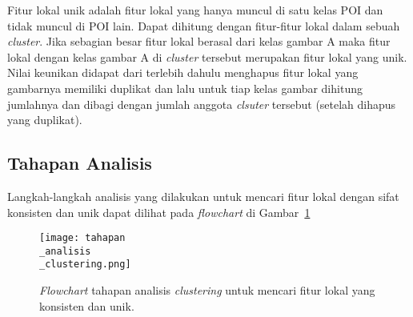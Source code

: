 Fitur lokal unik adalah fitur lokal yang hanya muncul di satu kelas POI dan tidak muncul di POI lain. Dapat dihitung dengan fitur-fitur lokal dalam sebuah \textit{cluster}. Jika sebagian besar fitur lokal berasal dari kelas gambar A maka fitur lokal dengan kelas gambar A di \textit{cluster} tersebut merupakan fitur lokal yang unik.  Nilai keunikan didapat dari terlebih dahulu menghapus fitur lokal yang gambarnya memiliki duplikat dan lalu untuk tiap kelas gambar dihitung jumlahnya dan dibagi dengan jumlah anggota \textit{clsuter} tersebut (setelah dihapus yang duplikat).

\subsection{Tahapan Analisis}
\label{subsec:tahapan_analisis_clustering}
Langkah-langkah analisis yang dilakukan untuk mencari fitur lokal dengan sifat konsisten dan unik dapat dilihat pada \textit{flowchart} di Gambar~\ref{fig:tahapan_analisis_clustering}
\begin{figure}[H]
	\centering
	\texttt{[image: tahapan\\\_analisis\\\_clustering.png]}
	\caption{\textit{Flowchart} tahapan analisis \textit{clustering} untuk mencari fitur lokal yang konsisten dan unik.}
	\label{fig:tahapan_analisis_clustering}
\end{figure}

